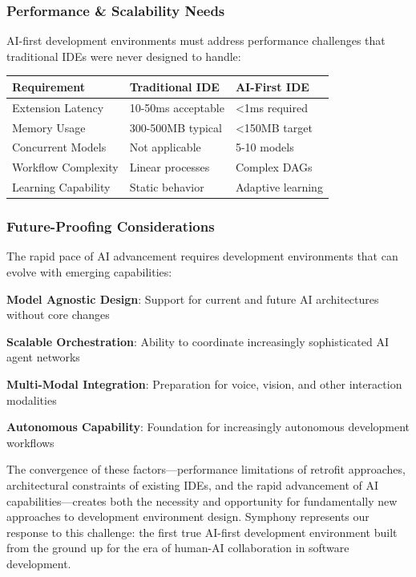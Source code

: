 \subsubsection{Performance \& Scalability Needs}

AI-first development environments must address performance challenges that traditional IDEs were never designed to handle:

\begin{center}
\begin{tabular}{@{}lll@{}}
\toprule
\textbf{Requirement} & \textbf{Traditional IDE} & \textbf{AI-First IDE} \\
\midrule
Extension Latency & 10-50ms acceptable & <1ms required \\
Memory Usage & 300-500MB typical & <150MB target \\
Concurrent Models & Not applicable & 5-10 models \\
Workflow Complexity & Linear processes & Complex DAGs \\
Learning Capability & Static behavior & Adaptive learning \\
\bottomrule
\end{tabular}
\end{center}

\subsubsection{Future-Proofing Considerations}

The rapid pace of AI advancement requires development environments that can evolve with emerging capabilities:

\begin{expandedlist}
    \item \textbf{Model Agnostic Design}: Support for current and future AI architectures without core changes
    \item \textbf{Scalable Orchestration}: Ability to coordinate increasingly sophisticated AI agent networks
    \item \textbf{Multi-Modal Integration}: Preparation for voice, vision, and other interaction modalities
    \item \textbf{Autonomous Capability}: Foundation for increasingly autonomous development workflows
\end{expandedlist}

The convergence of these factors—performance limitations of retrofit approaches, architectural constraints of existing IDEs, and the rapid advancement of AI capabilities—creates both the necessity and opportunity for fundamentally new approaches to development environment design. Symphony represents our response to this challenge: the first true AI-first development environment built from the ground up for the era of human-AI collaboration in software development.

